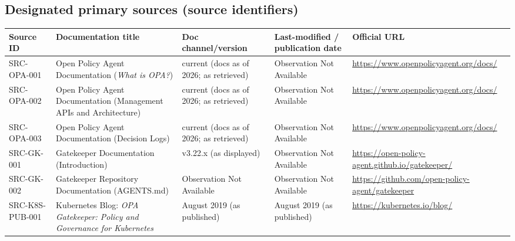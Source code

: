 \documentclass[11pt]{article}
\begin{document}
\subsection*{Designated primary sources (source identifiers)}
\begin{longtable}{@{}L{1.6in}L{2.9in}L{1.0in}L{0.9in}L{1.9in}@{}}
\toprule
Source ID & Documentation title & Doc channel/version & Last-modified / publication date & Official URL\\
\midrule
\endhead
SRC-OPA-001 & Open Policy Agent Documentation (\textit{What is OPA?}) & current (docs as of 2026; as retrieved) & Observation Not Available & \url{https://www.openpolicyagent.org/docs/}\\
SRC-OPA-002 & Open Policy Agent Documentation (Management APIs and Architecture) & current (docs as of 2026; as retrieved) & Observation Not Available & \url{https://www.openpolicyagent.org/docs/}\\
SRC-OPA-003 & Open Policy Agent Documentation (Decision Logs) & current (docs as of 2026; as retrieved) & Observation Not Available & \url{https://www.openpolicyagent.org/docs/}\\
SRC-GK-001 & Gatekeeper Documentation (Introduction) & v3.22.x (as displayed) & Observation Not Available & \url{https://open-policy-agent.github.io/gatekeeper/}\\
SRC-GK-002 & Gatekeeper Repository Documentation (AGENTS.md) & Observation Not Available & Observation Not Available & \url{https://github.com/open-policy-agent/gatekeeper}\\
SRC-K8S-PUB-001 & Kubernetes Blog: \textit{OPA Gatekeeper: Policy and Governance for Kubernetes} & August 2019 (as published) & August 2019 (as published) & \url{https://kubernetes.io/blog/}\\
\bottomrule
\end{longtable}
\end{document}
